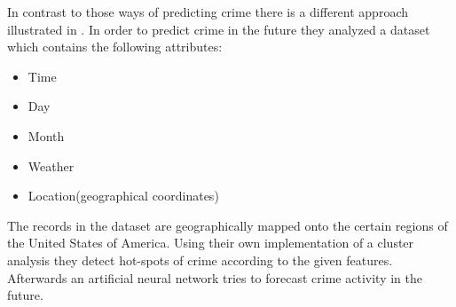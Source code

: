 \noindent In contrast to those ways of predicting crime there is a
different approach illustrated in \cite{forecast}. In order to predict
crime in the future they analyzed a dataset which contains the
following attributes:
\begin{itemize}
	\setlength{\itemsep}{-2pt}
	\item Time
	\item Day
	\item Month
	\item Weather
	\item Location(geographical coordinates) 
\end{itemize}
The records in the dataset are geographically mapped onto the certain
regions of the United States of America. Using their own
implementation of a cluster analysis they detect hot-spots of crime
according to the given features. Afterwards an artificial neural
network tries to forecast crime activity in the future.

